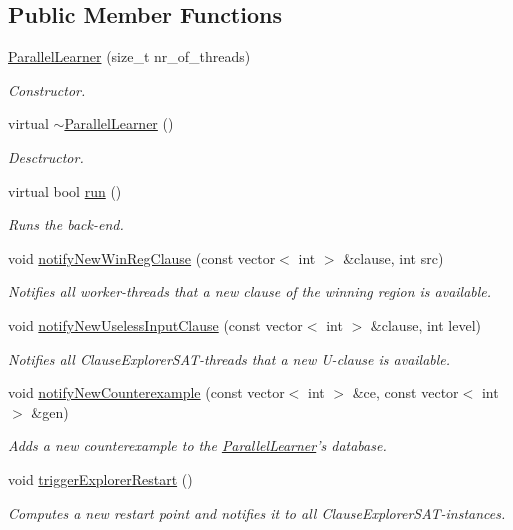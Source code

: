 \subsection*{Public Member Functions}
\begin{DoxyCompactItemize}
\item 
\hyperlink{classParallelLearner_a469e826d756c7c1a932128cfb17ce380}{Parallel\-Learner} (size\-\_\-t nr\-\_\-of\-\_\-threads)
\begin{DoxyCompactList}\small\item\em Constructor. \end{DoxyCompactList}\item 
virtual \hyperlink{classParallelLearner_a42d85a531cab28bdcb345c37a0b08730}{$\sim$\-Parallel\-Learner} ()
\begin{DoxyCompactList}\small\item\em Desctructor. \end{DoxyCompactList}\item 
virtual bool \hyperlink{classParallelLearner_a93acb74e7c8504d0ef2bd3697441b745}{run} ()
\begin{DoxyCompactList}\small\item\em Runs the back-\/end. \end{DoxyCompactList}\item 
void \hyperlink{classParallelLearner_a10b8346745051c95f05a1bc8356fcf8d}{notify\-New\-Win\-Reg\-Clause} (const vector$<$ int $>$ \&clause, int src)
\begin{DoxyCompactList}\small\item\em Notifies all worker-\/threads that a new clause of the winning region is available. \end{DoxyCompactList}\item 
void \hyperlink{classParallelLearner_a0a8405e4fb7331f3f3df2711fdaebdab}{notify\-New\-Useless\-Input\-Clause} (const vector$<$ int $>$ \&clause, int level)
\begin{DoxyCompactList}\small\item\em Notifies all Clause\-Explorer\-S\-A\-T-\/threads that a new U-\/clause is available. \end{DoxyCompactList}\item 
void \hyperlink{classParallelLearner_a8c59cc455059943f8f9cdb8a60526f5c}{notify\-New\-Counterexample} (const vector$<$ int $>$ \&ce, const vector$<$ int $>$ \&gen)
\begin{DoxyCompactList}\small\item\em Adds a new counterexample to the \hyperlink{classParallelLearner}{Parallel\-Learner}'s database. \end{DoxyCompactList}\item 
void \hyperlink{classParallelLearner_a2b8e4330afb7e99c19d2d7da15c30cc3}{trigger\-Explorer\-Restart} ()
\begin{DoxyCompactList}\small\item\em Computes a new restart point and notifies it to all Clause\-Explorer\-S\-A\-T-\/instances. \end{DoxyCompactList}\end{DoxyCompactItemize}
